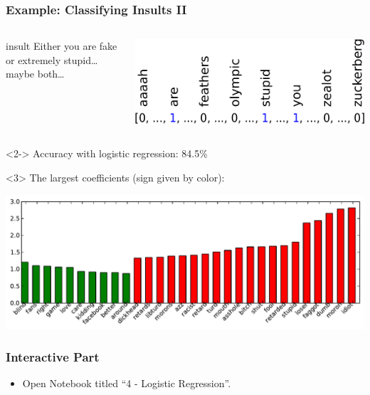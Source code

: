 \begin{frame}[t]
    \frametitle{Example: Classifying Insults II}
    \begin{columns}[t]
            \begin{beamercolorbox}[sep=1em,wd=5cm]{insult}
                Either you are fake or extremely stupid\dots maybe both\dots\\
            \end{beamercolorbox}
            \includegraphics[width=.9\linewidth]{logreg-pics/bag_of_words-crop}\\
            
    \end{columns}
    \vspace{3mm}
    \begin{onlyenv}<2->
        Accuracy with logistic regression: 84.5\%\\
    \end{onlyenv}
    \vspace{3mm}
    \begin{onlyenv}<3>
        The largest coefficients (sign given by color):
        \begin{center}
            \includegraphics[width=.9\linewidth]{logreg-pics/bow_coef}
        \end{center}
    \end{onlyenv}
\end{frame}

\begin{frame}
  \frametitle{Interactive Part}
  \begin{itemize}
      \item Open Notebook titled ``4 - Logistic Regression''.
  \end{itemize}
\end{frame}
